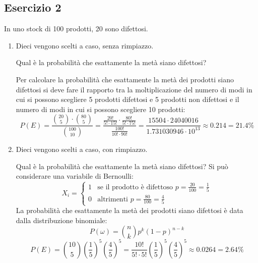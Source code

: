 \documentclass[a4paper]{article}
\theoremstyle{break}
\theoremstyle{break}
\theoremstyle{break}
\theoremstyle{break}
\begin{document}
\subsection{Esercizio 2}
In uno stock di 100 prodotti, 20 sono difettosi.
\begin{enumerate}
	\item Dieci vengono scelti a caso, senza rimpiazzo.

	      \noindent Qual è la probabilità che esattamente la metà siano difettosi?

	      \vspace{1em}
	      Per calcolare la probabilità che esattamente la metà dei prodotti siano difettosi
	      si deve fare il rapporto tra la moltiplicazione del numero di modi in cui si possono
	      scegliere 5 prodotti difettosi e 5 prodotti non difettosi e il numero di modi in
	      cui si possono scegliere 10 prodotti:
	      \[
		      P(E) = \frac{\binom{20}{5} \cdot \binom{80}{5}}{\binom{100}{10}} =
		      \frac{\frac{20!}{5! \cdot 15!}\cdot \frac{80!}{5! \cdot 75!}}{\frac{100!}{10! \cdot 90!}} =
		      \frac{15504 \cdot 24040016}{1.731030946 \cdot 10^{13}} \approx 0.214 = 21.4\%
	      \]
	\item Dieci vengono scelti a caso, con rimpiazzo.

	      \noindent Qual è la probabilità che esattamente la metà siano difettosi?
	      \vspace{1em}
	      Si può considerare una variabile di Bernoulli:
	      \[
		      X_i = \begin{cases}
			      1 & \text{se il prodotto è difettoso } p = \frac{20}{100} = \frac{1}{5} \\
			      0 & \text{altrimenti } p = \frac{80}{100} = \frac{4}{5}
		      \end{cases}
	      \]
	      La probabilità che esattamente la metà dei prodotti siano difettosi è data dalla
	      distribuzione binomiale:
	      \[
		      P(\omega) = \binom{n}{k} p^k (1-p)^{n-k}
	      \]
	      \[
		      P(E) = \binom{10}{5} \left( \frac{1}{5} \right)^5 \left( \frac{4}{5} \right)^5 =
		      \frac{10!}{5! \cdot 5!} \left( \frac{1}{5} \right)^5 \left( \frac{4}{5} \right)^5 \approx
		      0.0264 = 2.64\%
	      \]
\end{enumerate}
\end{document}
